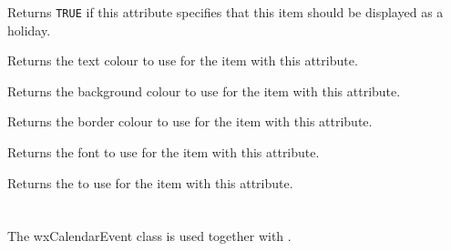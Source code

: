 \label{wxcalendardateattrisholiday}


Returns {\tt TRUE} if this attribute specifies that this item should be
displayed as a holiday.

\label{wxcalendardateattrgettextcolour}


Returns the text colour to use for the item with this attribute.

\label{wxcalendardateattrgetbackgroundcolour}


Returns the background colour to use for the item with this attribute.

\label{wxcalendardateattrgetbordercolour}


Returns the border colour to use for the item with this attribute.

\label{wxcalendardateattrgetfont}


Returns the font to use for the item with this attribute.

\label{wxcalendardateattrgetborder}


Returns the  to use for the item with this attribute.

\section{}\label{wxcalendarevent}

The wxCalendarEvent class is used together with 
.




